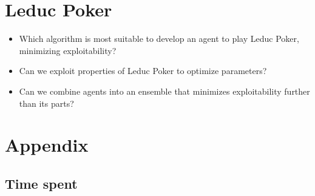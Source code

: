 \documentclass[10pt,a4paper]{article}
\begin{document}
\section{Leduc Poker}
\begin{tcolorbox}
\begin{itemize}
\item{Which algorithm is most suitable to develop an agent to play Leduc Poker, minimizing exploitability?}
\item{Can we exploit properties of Leduc Poker to optimize parameters?}
\item{Can we combine agents into an ensemble that minimizes exploitability further than its parts?}
\end{itemize}
\end{tcolorbox}




\section*{Appendix}
\subsection{Time spent}
\end{document}
